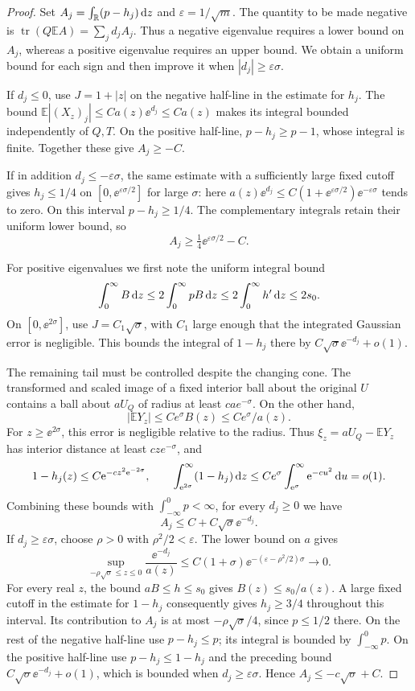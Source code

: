 \begin{proof}
Set $A_j=\int_{\mathbb{R}}(p-h_j)\,\mathrm{d} z$ and $\varepsilon=1/\sqrt m$. The quantity to be made negative is $\operatorname{tr}(Q\mathbb{E}A)=\sum_jd_jA_j$. Thus a negative eigenvalue requires a lower bound on $A_j$, whereas a positive eigenvalue requires an upper bound. We obtain a uniform bound for each sign and then improve it when $|d_j|\ge\varepsilon\sigma$.

If $d_j\le0$, use $J=1+|z|$ on the negative half-line in the estimate for $h_j$. The bound $\mathbb{E}|(X_z)_j|\le Ca(z)\ee^{d_j}\le Ca(z)$ makes its integral bounded independently of $Q,T$. On the positive half-line, $p-h_j\ge p-1$, whose integral is finite. Together these give $A_j\ge-C$.

If in addition $d_j\le-\varepsilon\sigma$, the same estimate with a sufficiently large fixed cutoff gives $h_j\le1/4$ on $[0,\ee^{\varepsilon\sigma/2}]$ for large $\sigma$: here $a(z)\ee^{d_j}\le C(1+\ee^{\varepsilon\sigma/2})\ee^{-\varepsilon\sigma}$ tends to zero. On this interval $p-h_j\ge1/4$. The complementary integrals retain their uniform lower bound, so
\[
A_j\ge\tfrac14\ee^{\varepsilon\sigma/2}-C.
\]

For positive eigenvalues we first note the uniform integral bound
\[
\int_0^\infty B\,\mathrm{d} z\le2\int_0^\infty pB\,\mathrm{d} z
\le2\int_0^\infty h'\,\mathrm{d} z\le2s_0.
\]
On $[0,\ee^{2\sigma}]$, use $J=C_1\sqrt\sigma$, with $C_1$ large enough that the integrated Gaussian error is negligible. This bounds the integral of $1-h_j$ there by $C\sqrt\sigma \ee^{-d_j}+o(1)$.

The remaining tail must be controlled despite the changing cone. The transformed and scaled image of a fixed interior ball about the original $U$ contains a ball about $aU_Q$ of radius at least $cae^{-\sigma}$. On the other hand,
\[
|\mathbb{E}Y_z|\le Ce^\sigma B(z)\le Ce^\sigma/a(z).
\]
For $z\ge \ee^{2\sigma}$, this error is negligible relative to the radius. Thus $\xi_z=aU_Q-\mathbb{E}Y_z$ has interior distance at least $cze^{-\sigma}$, and
\[
1-h_j(z)\le C \mathrm{e}^{-cz^2\mathrm{e}^{-2\sigma}},\qquad
\int_{\mathrm{e}^{2\sigma}}^\infty(1-h_j)\,\mathrm{d} z
\le Ce^\sigma\int_{\mathrm{e}^\sigma}^\infty \mathrm{e}^{-cu^2}\,\mathrm{d} u=o(1).
\]
Combining these bounds with $\int_{-\infty}^0p<\infty$, for every $d_j\ge0$ we have
\[
A_j\le C+C\sqrt\sigma \ee^{-d_j}.
\]
If $d_j\ge\varepsilon\sigma$, choose $\rho>0$ with $\rho^2/2<\varepsilon$. The lower bound on $a$ gives
\[
\sup_{-\rho\sqrt\sigma\le z\le0}\frac{\ee^{-d_j}}{a(z)}
\le C(1+\sigma)\ee^{-(\varepsilon-\rho^2/2)\sigma}\longrightarrow0.
\]
For every real $z$, the bound $aB\le h\le s_0$ gives $B(z)\le s_0/a(z)$. A large fixed cutoff in the estimate for $1-h_j$ consequently gives $h_j\ge3/4$ throughout this interval. Its contribution to $A_j$ is at most $-\rho\sqrt\sigma/4$, since $p\le1/2$ there. On the rest of the negative half-line use $p-h_j\le p$; its integral is bounded by $\int_{-\infty}^0p$. On the positive half-line use $p-h_j\le1-h_j$ and the preceding bound $C\sqrt\sigma \ee^{-d_j}+o(1)$, which is bounded when $d_j\ge\varepsilon\sigma$. Hence $A_j\le-c\sqrt\sigma+C$.


\end{proof}

